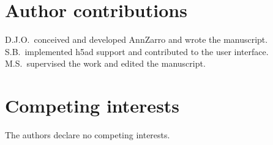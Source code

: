 \documentclass[11pt]{article}
\begin{document}
\section*{Author contributions}
D.J.O.\ conceived and developed AnnZarro and wrote the manuscript. S.B.\ implemented h5ad support and contributed to the user interface. M.S.\ supervised the work and edited the manuscript.

\section*{Competing interests}
The authors declare no competing interests.




\end{document}
